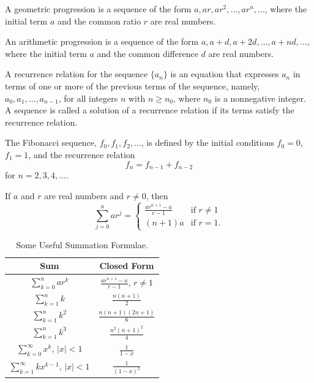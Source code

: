 \begin{defn}
A geometric progression is a sequence of the form $a, ar, ar^2, \ldots, ar^n, \ldots$, where the initial term $a$ and the common ratio $r$ are real numbers.
\end{defn}
\begin{defn}
An arithmetic progression is a sequence of the form $a, a + d, a + 2d, \ldots, a + nd, \ldots$, where the initial term $a$ and the common difference $d$ are real numbers.

\end{defn}
\begin{defn}
A recurrence relation for the sequence $\{a_n\}$ is an equation that expresses $a_n$ in terms of one or more of the previous terms of the sequence, namely, $a_0, a_1, \ldots, a_{n-1}$, for all integers $n$ with $n \geq n_0$, where $n_0$ is a nonnegative integer. A sequence is called a solution of a recurrence relation if its terms satisfy the recurrence relation.
\end{defn}
\begin{defn}
The Fibonacci sequence, $f_0, f_1, f_2, \ldots$, is defined by the initial conditions $f_0 = 0$, $f_1 = 1$, and the recurrence relation
\[f_n = f_{n-1} + f_{n-2}\]
for \(n = 2, 3, 4, \ldots\).
\end{defn}
\begin{defn}
If \(a\) and \(r\) are real numbers and \(r \neq 0\), then
\[
\sum_{j=0}^{n} ar^j =
\begin{cases}
    \frac{ar^{n+1} - a}{r - 1} & \text{if } r \neq 1 \\
    (n + 1)a & \text{if } r = 1.
\end{cases}
\]
\end{defn}


\begin{table}[h]
\centering
\caption{Some Useful Summation Formulae.}
\begin{tabular}{|c|c|}
\hline
Sum & Closed Form \\
\hline
$\displaystyle\sum_{k=0}^{n} ar^k$ & $\frac{ar^{n+1} - a}{r - 1}$, $r \neq 1$ \\
\hline
$\displaystyle\sum_{k=1}^{n} k$ & $\frac{n(n + 1)}{2}$ \\
\hline
$\displaystyle\sum_{k=1}^{n} k^2$ & $\frac{n(n + 1)(2n + 1)}{6}$ \\
\hline
$\displaystyle\sum_{k=1}^{n} k^3$ & $\frac{n^2(n + 1)^2}{4}$ \\
\hline
$\displaystyle\sum_{k=0}^{\infty} x^k$, $|x| < 1$ & $\frac{1}{1 - x}$ \\
\hline
$\displaystyle\sum_{k=1}^{\infty} kx^{k-1}$, $|x| < 1$ & $\frac{1}{(1 - x)^2}$ \\
\hline
\end{tabular}
\end{table}
\newpage
